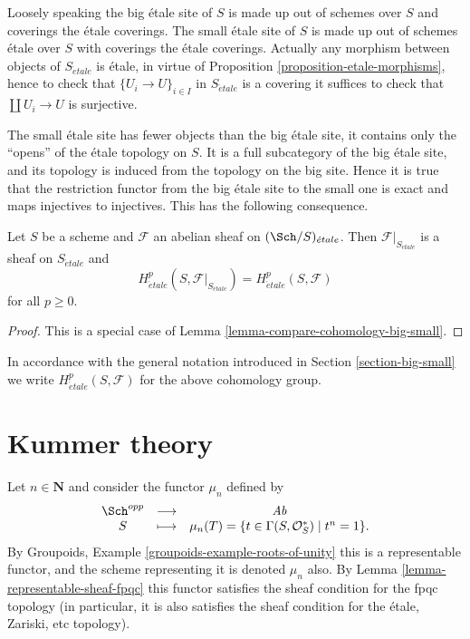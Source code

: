\noindent
Loosely speaking the big \'etale site of $S$ is made up out of schemes over $S$
and coverings the \'etale coverings. The small \'etale site of $S$ is made up
out of schemes \'etale over $S$ with coverings the \'etale coverings.
Actually any morphism between objects of $S_{\acute{e}tale}$ is \'etale, in
virtue of
Proposition \ref{proposition-etale-morphisms},
hence to check that $\{U_i \to U\}_{i \in I}$ in $S_{\acute{e}tale}$
is a covering it suffices to check that $\coprod U_i \to U$ is surjective.

\medskip\noindent
The small \'etale site has fewer objects than the big \'etale site, it
contains only the ``opens'' of the \'etale topology on $S$. It is a full
subcategory of the big \'etale site, and its topology is induced from the
topology on the big site. Hence it is true that the restriction functor
from the big \'etale site to the small one is exact and maps injectives to
injectives. This has the following consequence.

\begin{proposition}
\label{proposition-cohomology-restrict-small-site}
Let $S$ be a scheme and $\mathcal{F}$ an abelian sheaf on
$(\Sch/S)_{\acute{e}tale}$.
Then $\mathcal{F}|_{S_{\acute{e}tale}}$ is a sheaf on $S_{\acute{e}tale}$ and
$$
H^p_{\acute{e}tale}(S, \mathcal{F}|_{S_{\acute{e}tale}}) =
H^p_{\acute{e}tale}(S, \mathcal{F})
$$
for all $p \geq 0$.
\end{proposition}

\begin{proof}
This is a special case of Lemma \ref{lemma-compare-cohomology-big-small}.
\end{proof}

\noindent
In accordance with the general notation introduced in
Section \ref{section-big-small}
we write $H_{\acute{e}tale}^p(S, \mathcal{F})$ for the above cohomology group.





\section{Kummer theory}
\label{section-kummer}

\noindent
Let $n \in \mathbf{N}$ and consider the functor $\mu_n$ defined by
$$
\begin{matrix}
\Sch^{opp} & \longrightarrow & \textit{Ab} \\
S & \longmapsto &
\mu_n(T)
=
\{t \in \Gamma(S, \mathcal{O}_S^*) \mid t^n = 1 \}.
\end{matrix}
$$
By
Groupoids, Example \ref{groupoids-example-roots-of-unity}
this is a representable functor, and the scheme representing it
is denoted $\mu_n$ also. By
Lemma \ref{lemma-representable-sheaf-fpqc}
this functor satisfies the sheaf condition for the fpqc topology
(in particular, it is also satisfies the sheaf condition for the
\'etale, Zariski, etc topology).

